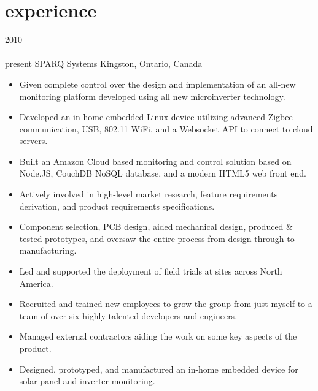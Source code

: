 
\section{experience}

\begin{entrylist}
\entry
  {2010\\\faChevronDown\\{\bodyfontit present}}
  {SPARQ Systems}
  {Kingston, Ontario, Canada}
  {
\begin{itemize}[leftmargin=12pt]
	\item Given complete control over the design and implementation of an all-new monitoring platform developed using all new microinverter technology.
  \item Developed an in-home embedded {\bodyfontit Linux} device utilizing advanced {\bodyfontit Zigbee} communication, USB, 802.11 {\bodyfontit WiFi}, and a {\bodyfontit Websocket} API to connect to cloud servers.
  \item Built an Amazon {\bodyfontit Cloud} based monitoring and control solution based on {\bodyfontit Node.JS}, {\bodyfontit CouchDB} NoSQL database, and a modern {\bodyfontit HTML5} web front end.
	\item Actively involved in high-level market research, feature requirements derivation, and product requirements specifications.
	\item Component selection, PCB design, aided mechanical design, produced \& tested prototypes, and oversaw the entire process from design through to manufacturing.
  \item Led and supported the deployment of field trials at sites across North America.
	\item Recruited and trained new employees to grow the group from just myself to a team of over six highly talented developers and engineers.
	\item Managed external contractors aiding the work on some key aspects of the product.
\end{itemize}
\begin{itemize}[leftmargin=12pt]
	\item Designed, prototyped, and manufactured an in-home {\bodyfontit embedded device} for solar panel and inverter monitoring.

\end{itemize}}
\end{entrylist}
